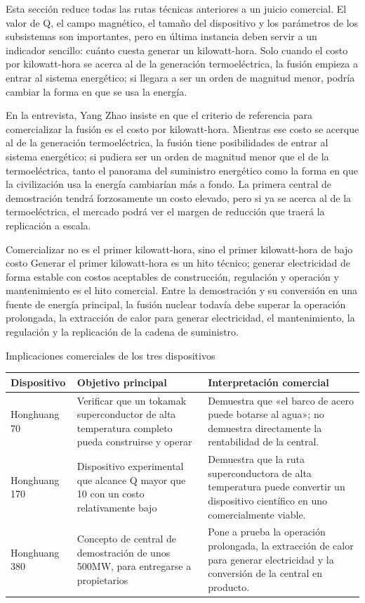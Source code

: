 Esta sección reduce todas las rutas técnicas anteriores a un juicio comercial. El valor de Q, el campo magnético, el tamaño del dispositivo y los parámetros de los subsistemas son importantes, pero en última instancia deben servir a un indicador sencillo: cuánto cuesta generar un kilowatt-hora. Solo cuando el costo por kilowatt-hora se acerca al de la generación termoeléctrica, la fusión empieza a entrar al sistema energético; si llegara a ser un orden de magnitud menor, podría cambiar la forma en que se usa la energía.

En la entrevista, Yang Zhao insiste en que el criterio de referencia para comercializar la fusión es el costo por kilowatt-hora. Mientras ese costo se acerque al de la generación termoeléctrica, la fusión tiene posibilidades de entrar al sistema energético; si pudiera ser un orden de magnitud menor que el de la termoeléctrica, tanto el panorama del suministro energético como la forma en que la civilización usa la energía cambiarían más a fondo. La primera central de demostración tendrá forzosamente un costo elevado, pero si ya se acerca al de la termoeléctrica, el mercado podrá ver el margen de reducción que traerá la replicación a escala.

\begin{importantbox}{Comercializar no es el primer kilowatt-hora, sino el primer kilowatt-hora de bajo costo}
Generar el primer kilowatt-hora es un hito técnico; generar electricidad de forma estable con costos aceptables de construcción, regulación y operación y mantenimiento es el hito comercial. Entre la demostración y su conversión en una fuente de energía principal, la fusión nuclear todavía debe superar la operación prolongada, la extracción de calor para generar electricidad, el mantenimiento, la regulación y la replicación de la cadena de suministro.
\end{importantbox}

\begin{knowledgebox}{Implicaciones comerciales de los tres dispositivos}
\begin{tabularx}{\textwidth}{p{}p{}X}
\toprule
Dispositivo & Objetivo principal & Interpretación comercial \\
\midrule
Honghuang 70 & Verificar que un tokamak superconductor de alta temperatura completo pueda construirse y operar & Demuestra que «el barco de acero puede botarse al agua»; no demuestra directamente la rentabilidad de la central. \\
Honghuang 170 & Dispositivo experimental que alcance Q mayor que 10 con un costo relativamente bajo & Demuestra que la ruta superconductora de alta temperatura puede convertir un dispositivo científico en uno comercialmente viable. \\
Honghuang 380 & Concepto de central de demostración de unos 500MW, para entregarse a propietarios & Pone a prueba la operación prolongada, la extracción de calor para generar electricidad y la conversión de la central en producto. \\
\bottomrule
\end{tabularx}
\end{knowledgebox}

